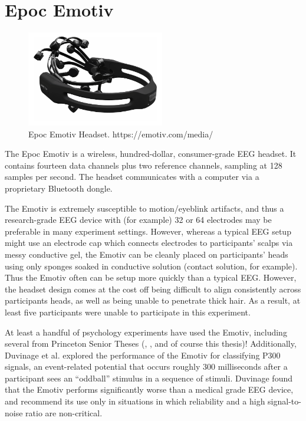 \documentclass[12pt]{report}
\begin{document}
\section{Epoc Emotiv}
	\begin{figure}
		\includegraphics[width=6cm]{emotiv}	
		\centering
		\caption{Epoc Emotiv Headset. https://emotiv.com/media/}
	\end{figure}
	
	The Epoc Emotiv\cite{emotiv} is a wireless, hundred-dollar, consumer-grade EEG headset.  It contains fourteen data channels plus two reference channels, sampling at 128 samples per second.  The headset communicates with a computer via a proprietary Bluetooth dongle.
	
	The Emotiv is extremely susceptible to motion/eyeblink artifacts, and thus a research-grade EEG device with (for example) 32 or 64 electrodes may be preferable in many experiment settings.  However, whereas a typical EEG setup might use an electrode cap which connects electrodes to participants' scalps via messy conductive gel, the Emotiv can be cleanly placed on participants' heads using only sponges soaked in conductive solution (contact solution, for example).  Thus the Emotiv often can be setup more quickly than a typical EEG.  However, the headset design comes at the cost off being difficult to align consistently across participants heads, as well as being unable to penetrate thick hair.  As a result, at least five participants were unable to participate in this experiment.
	
	At least a handful of psychology experiments have used the Emotiv, including several from Princeton Senior Theses (\cite{Rafidi}, \cite{Adelson}, and of course this thesis)!  Additionally, Duvinage et al.\cite{Duvinage} explored the performance of the Emotiv for classifying P300 signals, an event-related potential that occurs roughly 300 milliseconds after a participant sees an ``oddball'' stimulus in a sequence of stimuli\cite{p300}.  Duvinage found that the Emotiv performs significantly worse than a medical grade EEG device, and recommend its use only in situations in which reliability and a high signal-to-noise ratio are non-critical.
	
\end{document}
